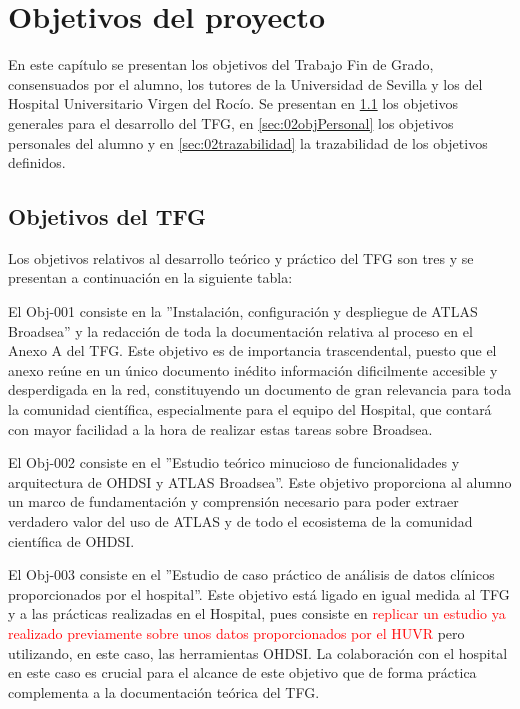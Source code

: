 \chapter{Objetivos del proyecto}\label{cap:02objetivos}

En este capítulo se presentan los objetivos del Trabajo Fin de Grado, consensuados por el alumno, los tutores de la Universidad de Sevilla y los del Hospital Universitario Virgen del Rocío. Se presentan en \ref{sec:02objTFG} los objetivos generales para el desarrollo del TFG, en \ref{sec:02objPersonal} los objetivos personales del alumno y en \ref{sec:02trazabilidad} la trazabilidad de los objetivos definidos.

\section{Objetivos del TFG} \label{sec:02objTFG}

Los objetivos relativos al desarrollo teórico y práctico del TFG son tres y se presentan a continuación en la siguiente tabla:



El Obj-001 consiste en la ''Instalación, configuración y despliegue de ATLAS Broadsea'' y la redacción de toda la documentación relativa al proceso en el Anexo A del TFG. Este objetivo es de importancia trascendental, puesto que el anexo reúne en un único documento inédito información dificilmente accesible y desperdigada en la red, constituyendo un documento de gran relevancia para toda la comunidad científica, especialmente para el equipo del Hospital, que contará con mayor facilidad a la hora de realizar estas tareas sobre Broadsea.

El Obj-002 consiste en el ''Estudio teórico minucioso de funcionalidades y arquitectura de OHDSI y ATLAS Broadsea''. Este objetivo proporciona al alumno un marco de fundamentación y comprensión necesario para poder extraer verdadero valor del uso de ATLAS y de todo el ecosistema de la comunidad científica de OHDSI.

El Obj-003 consiste en el ''Estudio de caso práctico de análisis de datos clínicos proporcionados por el hospital''. Este objetivo está ligado en igual medida al TFG y a las prácticas realizadas en el Hospital, pues consiste en \textcolor{red}{replicar un estudio ya realizado previamente sobre unos datos proporcionados por el HUVR} pero utilizando, en este caso, las herramientas OHDSI. La colaboración con el hospital en este caso es crucial para el alcance de este objetivo que de forma práctica complementa a la documentación teórica del TFG.


